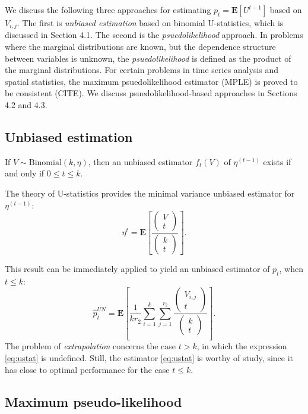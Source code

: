 \documentclass{article}
\newcommand{\E}{\textbf{E}}
\begin{document}
We discuss the following three approaches for estimating $p_t =
\E[U^{t-1}]$ based on $V_{i, j}$.  The first is \emph{unbiased
  estimation} based on binomial U-statistics, which is discussed in
Section 4.1.  The second is the \emph{psuedolikelihood} approach.  In
problems where the marginal distributions are known, but the
dependence structure between variables is unknown, the
\emph{psuedolikelihood} is defined as the product of the marginal
distributions.  For certain problems in time series analysis and
spatial statistics, the maximum psuedolikelihood estimator (MPLE) is
proved to be consistent (CITE).  We discuss psuedolikelihood-based
approaches in Sections 4.2 and 4.3.  

\subsection{Unbiased estimation}

If $V \sim \text{Binomial}(k, \eta)$, then an unbiased estimator $f_t(V)$ of $\eta^(t-1)$ exists
if and only if $0 \leq t \leq k$.

The theory of U-statistics provides the minimal variance unbiased estimator for $\eta^(t-1)$:
\[
\eta^t = \E\left[\frac{\begin{pmatrix}
V \\ t
\end{pmatrix}}{\begin{pmatrix}
k \\ t
\end{pmatrix}}\right].
\]

This result can be immediately applied to yield an unbiased estimator of $p_t$, when $t \leq k$:
\begin{equation}\label{eq:ustat}
\hat{p}_t^{UN} = \E\left[ \frac{1}{kr_2}\sum_{i=1}^k\sum_{j=1}^{r_2} \frac{\begin{pmatrix}
V_{i, j} \\ t
\end{pmatrix}}{\begin{pmatrix}
k \\ t
\end{pmatrix}} \right].
\end{equation}
The problem of \emph{extrapolation} concerns the case $t > k$, in
which the expression \eqref{eq:ustat} is undefined.  Still, the
estimator \eqref{eq:ustat} is worthy of study, since it has close to
optimal performance for the case $t \leq k$.

\subsection{Maximum pseudo-likelihood}
\end{document}
